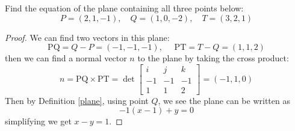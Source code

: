 \documentclass[openany]{book}
\begin{document}
\begin{prob}
    Find the equation of the plane containing all three points below:
    \begin{equation*}
        P=(2,1,-1), \quad Q=(1,0,-2), \quad T=(3,2,1)
    \end{equation*}
\end{prob}
\begin{proof}
    We can find two vectors in this plane:
    \begin{equation*}
        \text{PQ}=Q-P=(-1,-1,-1), \quad \text{ PT}=T-Q=(1,1,2)
    \end{equation*}
    then we can find a normal vector $n$ to the plane by taking the cross product:
    \begin{equation*}
        n=\text{PQ}\times\text{PT}=\det\begin{bmatrix}
            i&j&k\\
            -1&-1&-1\\
            1&1&2
        \end{bmatrix}=(-1,1,0)
    \end{equation*}
    Then by Definition \ref{plane}, using point $Q$, we see the plane can be written as 
    \begin{equation*}
        -1(x-1)+y=0
    \end{equation*}
    simplifying we get $x-y=1$.
\end{proof}
\end{document}
